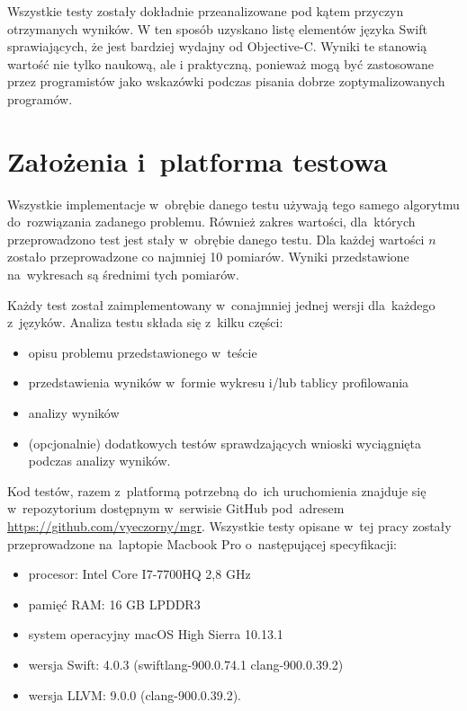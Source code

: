 \documentclass[mgr, shortabstract]{iithesis}
\begin{document}
Wszystkie testy zostały dokładnie przeanalizowane pod kątem przyczyn otrzymanych wyników. W ten sposób uzyskano listę elementów języka Swift sprawiających, że jest bardziej wydajny od Objective-C. Wyniki te stanowią wartość nie tylko naukową, ale i praktyczną, ponieważ mogą być zastosowane przez programistów jako wskazówki podczas pisania dobrze zoptymalizowanych programów.

\section{Założenia i~platforma testowa}

Wszystkie implementacje w~obrębie danego testu używają tego samego algorytmu do~rozwiązania zadanego problemu. Również zakres wartości, dla~których przeprowadzono test jest stały w~obrębie danego testu. Dla każdej wartości $n$ zostało przeprowadzone co najmniej 10 pomiarów. Wyniki przedstawione na~wykresach są średnimi tych pomiarów.

Każdy test został zaimplementowany w~conajmniej jednej wersji dla~każdego z~języków. Analiza testu składa się z~kilku części:

\begin{itemize}
    \item opisu problemu przedstawionego w~teście
    \item przedstawienia wyników w~formie wykresu i/lub tablicy profilowania
    \item analizy wyników
    \item (opcjonalnie) dodatkowych testów sprawdzających wnioski wyciągnięta podczas analizy wyników.
\end{itemize}

Kod testów, razem z~platformą potrzebną do~ich uruchomienia znajduje się w~repozytorium dostępnym w~serwisie GitHub pod~adresem \url{https://github.com/vyeczorny/mgr}. Wszystkie testy opisane w~tej pracy zostały przeprowadzone na~laptopie Macbook Pro o~następującej specyfikacji:

\begin{itemize}
    \item procesor: Intel Core I7-7700HQ 2,8 GHz
    \item pamięć RAM: 16 GB LPDDR3
    \item system operacyjny macOS High Sierra 10.13.1
    \item wersja Swift: 4.0.3 (swiftlang-900.0.74.1 clang-900.0.39.2)
    \item wersja LLVM: 9.0.0 (clang-900.0.39.2).
\end{itemize}
\end{document}

